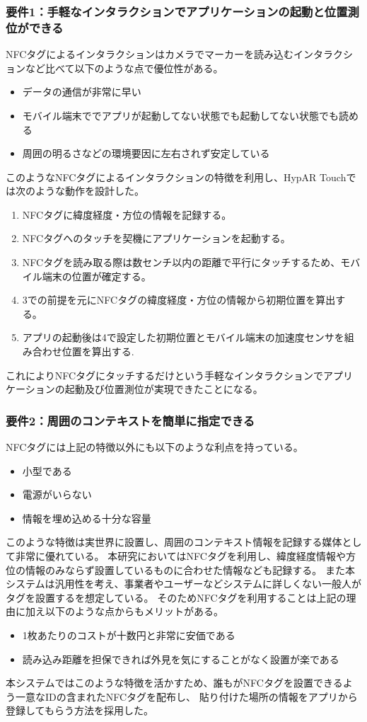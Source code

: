 \subsubsection*{要件1：手軽なインタラクションでアプリケーションの起動と位置測位ができる}
NFCタグによるインタラクションはカメラでマーカーを読み込むインタラクションなど比べて以下のような点で優位性がある。
\begin{itemize}
  \item データの通信が非常に早い
  \item モバイル端末ででアプリが起動してない状態でも起動してない状態でも読める　
  \item 周囲の明るさなどの環境要因に左右されず安定している
\end{itemize}
このようなNFCタグによるインタラクションの特徴を利用し、HypAR Touchでは次のような動作を設計した。
\begin{enumerate}
  \item NFCタグに緯度経度・方位の情報を記録する。
  \item NFCタグへのタッチを契機にアプリケーションを起動する。
  \item NFCタグを読み取る際は数センチ以内の距離で平行にタッチするため、モバイル端末の位置が確定する。
  \item 3での前提を元にNFCタグの緯度経度・方位の情報から初期位置を算出する。
  \item アプリの起動後は4で設定した初期位置とモバイル端末の加速度センサを組み合わせ位置を算出する.
\end{enumerate}
これによりNFCタグにタッチするだけという手軽なインタラクションでアプリケーションの起動及び位置測位が実現できたことになる。

\subsubsection*{要件2：周囲のコンテキストを簡単に指定できる}
NFCタグには上記の特徴以外にも以下のような利点を持っている。
\begin{itemize}
  \item 小型である
  \item 電源がいらない
  \item 情報を埋め込める十分な容量
\end{itemize}
このような特徴は実世界に設置し、周囲のコンテキスト情報を記録する媒体として非常に優れている。
本研究においてはNFCタグを利用し、緯度経度情報や方位の情報のみならず設置しているものに合わせた情報なども記録する。
また本システムは汎用性を考え、事業者やユーザーなどシステムに詳しくない一般人がタグを設置するを想定している。
そのためNFCタグを利用することは上記の理由に加え以下のような点からもメリットがある。
\begin{itemize}
  \item 1枚あたりのコストが十数円と非常に安価である
  \item 読み込み距離を担保できれば外見を気にすることがなく設置が楽である
\end{itemize}
本システムではこのような特徴を活かすため、誰もがNFCタグを設置できるよう一意なIDの含まれたNFCタグを配布し、
貼り付けた場所の情報をアプリから登録してもらう方法を採用した。


